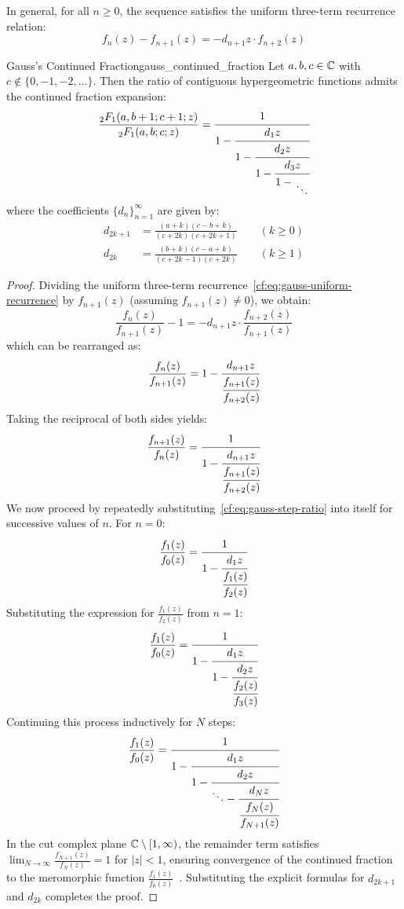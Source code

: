 \documentclass[a4paper]{article}
\begin{document}
In general, for all $n \ge 0$, the sequence satisfies the uniform three-term recurrence relation:
\begin{equation}\label{cf:eq:gauss-uniform-recurrence}
  f_n(z) - f_{n+1}(z) = - d_{n+1} z \cdot f_{n+2}(z)
\end{equation}

\begin{mytheorem}{Gauss's Continued Fraction}{gauss_continued_fraction}
  Let $a, b, c \in \mathbb{C}$ with $c \notin \{0, -1, -2, \dots\}$. Then the ratio of contiguous hypergeometric functions admits the continued fraction expansion:
  \[
    \frac{{_2F_1}(a, b+1; c+1; z)}{{_2F_1}(a, b; c; z)} = \cfrac{1}{1 - \cfrac{d_1 z}{1 - \cfrac{d_2 z}{1 - \cfrac{d_3 z}{1 - \CFDots}}}}
  \]
  where the coefficients $\{d_n\}_{n=1}^\infty$ are given by:
  \begin{align*}
    d_{2k+1} & = \frac{(a+k)(c-b+k)}{(c+2k)(c+2k+1)} \qquad (k \ge 0) \\
    d_{2k}   & = \frac{(b+k)(c-a+k)}{(c+2k-1)(c+2k)} \qquad (k \ge 1)
  \end{align*}

  \begin{proof}
    Dividing the uniform three-term recurrence~\eqref{cf:eq:gauss-uniform-recurrence} by $f_{n+1}(z)$ (assuming $f_{n+1}(z) \ne 0$), we obtain:
    \[
      \frac{f_n(z)}{f_{n+1}(z)} - 1 = - d_{n+1} z \cdot \frac{f_{n+2}(z)}{f_{n+1}(z)}
    \]
    which can be rearranged as:
    \[
      \frac{f_n(z)}{f_{n+1}(z)} = 1 - \cfrac{d_{n+1} z}{\cfrac{f_{n+1}(z)}{f_{n+2}(z)}}
    \]
    Taking the reciprocal of both sides yields:
    \begin{equation}\label{cf:eq:gauss-step-ratio}
      \frac{f_{n+1}(z)}{f_n(z)} = \cfrac{1}{1 - \cfrac{d_{n+1} z}{\cfrac{f_{n+1}(z)}{f_{n+2}(z)}}}
    \end{equation}
    We now proceed by repeatedly substituting~\eqref{cf:eq:gauss-step-ratio} into itself for successive values of $n$.
    For $n=0$:
    \[
      \frac{f_1(z)}{f_0(z)} = \cfrac{1}{1 - \cfrac{d_1 z}{\cfrac{f_1(z)}{f_2(z)}}}
    \]
    Substituting the expression for $\frac{f_1(z)}{f_2(z)}$ from $n=1$:
    \[
      \frac{f_1(z)}{f_0(z)} = \cfrac{1}{1 - \cfrac{d_1 z}{1 - \cfrac{d_2 z}{\cfrac{f_2(z)}{f_3(z)}}}}
    \]
    Continuing this process inductively for $N$ steps:
    \[
      \frac{f_1(z)}{f_0(z)} = \cfrac{1}{1 - \cfrac{d_1 z}{1 - \cfrac{d_2 z}{\ddots - \cfrac{d_N z}{\cfrac{f_N(z)}{f_{N+1}(z)}}}}}
    \]
    In the cut complex plane $\mathbb{C} \setminus [1, \infty)$, the remainder term satisfies
    $\lim_{N \to \infty} \frac{f_{N+1}(z)}{f_N(z)} = 1$ for $|z| < 1$,
    ensuring convergence of the continued fraction to the meromorphic function $\frac{f_1(z)}{f_0(z)}$~\cite{wall1948}.
    Substituting the explicit formulas for $d_{2k+1}$ and $d_{2k}$ completes the proof.
  \end{proof}
\end{mytheorem}
\end{document}
